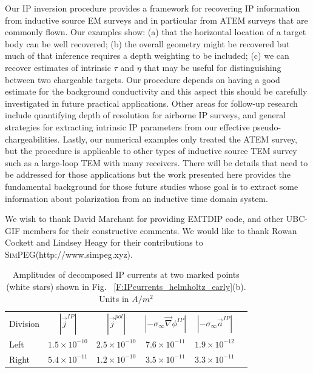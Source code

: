 \documentclass[extra,mreferee]{gji}
\newcommand{\SimPEG}{\textsc{SimPEG}\xspace}
\newcommand{\grad}{\vec \nabla}
\newcommand{\siginf}{\sigma_\infty}
\renewcommand {\j}  { {\vec j} }
\begin{document}
Our IP inversion procedure provides a framework for recovering IP information from inductive source EM surveys and in particular from ATEM surveys that are commonly flown. Our examples show: (a) that the horizontal location of a target body can be well recovered; (b) the overall geometry might be recovered but much of that inference requires a depth weighting to be included; (c)  we can recover estimates of intrinsic $\tau$ and $\eta$ that may be useful for distinguishing between two chargeable targets. Our procedure depends on having a good estimate for the background conductivity and this aspect this should be carefully investigated in future practical applications. Other areas for follow-up research include quantifying  depth of resolution for  airborne IP surveys, and general strategies for extracting intrinsic IP parameters from our effective pseudo-chargeabilities.
Lastly, our numerical examples only treated the ATEM survey, but the procedure is applicable to other types of inductive source TEM survey such as a large-loop TEM with many receivers. There will be details that need to be addressed for those applications but the work presented here provides the  fundamental background for those future studies whose goal is to extract some information about polarization from an inductive time domain system.

\begin{acknowledgments}
  We wish to thank David Marchant for providing EMTDIP code, and other UBC-GIF members for their constructive comments. We would like to thank Rowan Cockett and Lindsey Heagy for their contributions to \SimPEG (http://www.simpeg.xyz).
\end{acknowledgments}



\clearpage

\begin{table}
 \caption{Amplitudes of decomposed IP currents at two marked points (white stars) shown in Fig. ~\ref{F:IPcurrents_helmholtz_early}(b). Units in $A/m^2$}
 \label{T:DecompjIPcond}
 \begin{tabular}{@{}lccccc}
  Division & $| \j^{IP} |$ & $| \j^{pol} |$ & $| -\siginf\grad \phi^{IP} |$ & $| -\siginf\vec{a}^{IP} |$ \\
  Left  & $1.5\times 10^{-10}$ & $2.5\times 10^{-10}$ & $7.6\times 10^{-11}$ & $1.9\times 10^{-12}$ \\
  Right & $5.4\times 10^{-11}$ & $1.2\times 10^{-10}$ & $3.5\times 10^{-11}$ & $3.3\times 10^{-11}$ \\
 \end{tabular}
\end{table}
\end{document}
